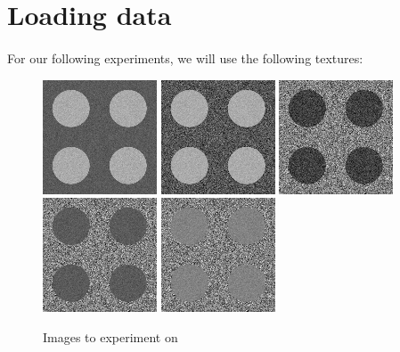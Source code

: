 \section{Loading data}
\paragraph{}
For our following experiments, we will use the following textures:
\begin{figure}[h]
    \centering
    \includegraphics[scale=0.6]{rdf-2-classes-texture-0.png}
    \includegraphics[scale=0.6]{rdf-2-classes-texture-1.png}
    \includegraphics[scale=0.6]{rdf-2-classes-texture-2.png}
    \includegraphics[scale=0.6]{rdf-2-classes-texture-3.png}
    \includegraphics[scale=0.6]{rdf-2-classes-texture-4.png}
    \caption{Images to experiment on}
\end{figure}


